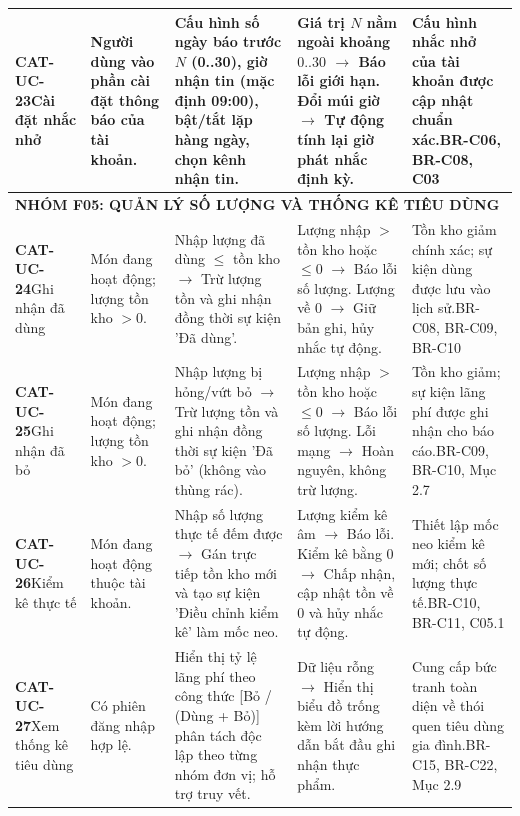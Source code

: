 \documentclass[10pt,a4paper]{article}
\begin{document}
\begin{longtable}{|p{2.1cm}|p{2.3cm}|p{3.5cm}|p{3.8cm}|p{3.0cm}|}
\hline
\textbf{CAT-UC-23}\newline Cài đặt nhắc nhở & Người dùng vào phần cài đặt thông báo của tài khoản. & Cấu hình số ngày báo trước $N$ (0..30), giờ nhận tin (mặc định 09:00), bật/tắt lặp hàng ngày, chọn kênh nhận tin. & Giá trị $N$ nằm ngoài khoảng $0..30$ $\to$ Báo lỗi giới hạn. Đổi múi giờ $\to$ Tự động tính lại giờ phát nhắc định kỳ. & Cấu hình nhắc nhở của tài khoản được cập nhật chuẩn xác.\newline BR-C06, BR-C08, C03 \\
\hline

\multicolumn{5}{|l|}{\textbf{\color{primary}NHÓM F05: QUẢN LÝ SỐ LƯỢNG VÀ THỐNG KÊ TIÊU DÙNG}} \\
\hline
\textbf{CAT-UC-24}\newline Ghi nhận đã dùng & Món đang hoạt động; lượng tồn kho $>0$. & Nhập lượng đã dùng $\le$ tồn kho $\to$ Trừ lượng tồn và ghi nhận đồng thời sự kiện 'Đã dùng'. & Lượng nhập $>$ tồn kho hoặc $\le 0$ $\to$ Báo lỗi số lượng. Lượng về 0 $\to$ Giữ bản ghi, hủy nhắc tự động. & Tồn kho giảm chính xác; sự kiện dùng được lưu vào lịch sử.\newline BR-C08, BR-C09, BR-C10 \\
\hline
\textbf{CAT-UC-25}\newline Ghi nhận đã bỏ & Món đang hoạt động; lượng tồn kho $>0$. & Nhập lượng bị hỏng/vứt bỏ $\to$ Trừ lượng tồn và ghi nhận đồng thời sự kiện 'Đã bỏ' (không vào thùng rác). & Lượng nhập $>$ tồn kho hoặc $\le 0$ $\to$ Báo lỗi số lượng. Lỗi mạng $\to$ Hoàn nguyên, không trừ lượng. & Tồn kho giảm; sự kiện lãng phí được ghi nhận cho báo cáo.\newline BR-C09, BR-C10, Mục 2.7 \\
\hline
\textbf{CAT-UC-26}\newline Kiểm kê thực tế & Món đang hoạt động thuộc tài khoản. & Nhập số lượng thực tế đếm được $\to$ Gán trực tiếp tồn kho mới và tạo sự kiện 'Điều chỉnh kiểm kê' làm mốc neo. & Lượng kiểm kê âm $\to$ Báo lỗi. Kiểm kê bằng 0 $\to$ Chấp nhận, cập nhật tồn về 0 và hủy nhắc tự động. & Thiết lập mốc neo kiểm kê mới; chốt số lượng thực tế.\newline BR-C10, BR-C11, C05.1 \\
\hline
\textbf{CAT-UC-27}\newline Xem thống kê tiêu dùng & Có phiên đăng nhập hợp lệ. & Hiển thị tỷ lệ lãng phí theo công thức [Bỏ / (Dùng + Bỏ)] phân tách độc lập theo từng nhóm đơn vị; hỗ trợ truy vết. & Dữ liệu rỗng $\to$ Hiển thị biểu đồ trống kèm lời hướng dẫn bắt đầu ghi nhận thực phẩm. & Cung cấp bức tranh toàn diện về thói quen tiêu dùng gia đình.\newline BR-C15, BR-C22, Mục 2.9 \\

\end{longtable}
\end{document}
